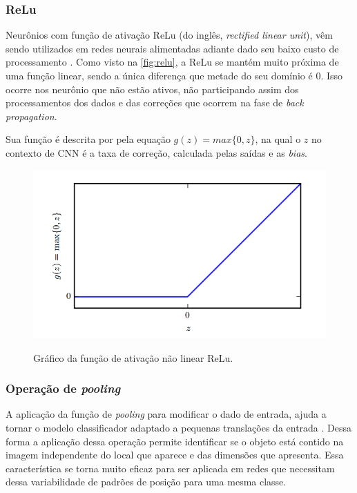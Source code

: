 \subsubsection{ReLu}

Neurônios com função de ativação ReLu (do inglês, \textit{rectified linear unit}), vêm sendo utilizados em redes neurais alimentadas adiante dado seu baixo custo de processamento \cite{glorot2011deep}. Como visto na \autoref{fig:relu}, a ReLu se mantém muito próxima de uma função linear, sendo a única diferença que metade do seu domínio é 0. Isso ocorre nos neurônio que não estão ativos, não participando assim dos processamentos dos dados e das correções que ocorrem na fase de \textit{back propagation}.
\par Sua função é descrita por pela equação $g(z)=max\{0,z\}$, na qual o $z$ no contexto de CNN é a taxa de correção, calculada pelas saídas e as \textit{bias}.
\begin{figure}[H]
  \centering
  \caption{Gráfico da função de ativação não linear ReLu.}
  \includegraphics[width=400pt]{dados/figuras/relu}
  \label{fig:relu}
\end{figure}

\subsubsection{Operação de \textit{pooling}}
A aplicação da função de \textit{pooling} para modificar o dado de entrada, ajuda a tornar o modelo classificador adaptado a pequenas translações da entrada \cite{Goodfellow-et-al-2016}. Dessa forma a aplicação dessa operação permite identificar se o objeto está contido na imagem independente do local que aparece e das dimensões que apresenta. Essa característica se torna muito eficaz para ser aplicada em redes que necessitam dessa variabilidade de padrões de posição para uma mesma classe.


